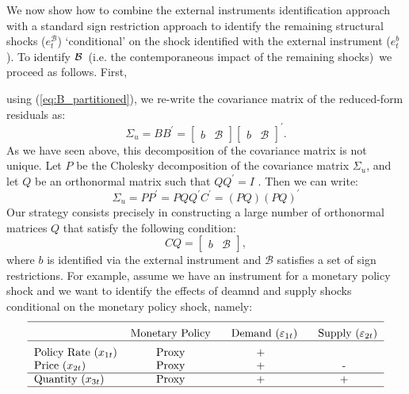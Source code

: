 \documentclass[10pt]{article}
\begin{document}
We now show how to combine the external instruments identification approach
with a standard sign restriction approach to identify the remaining
structural shocks ($e_{t}^{\mathcal{B}}$) `conditional' on the shock
identified with the external instrument ($e_{t}^{b}$). To identify $\mathcal{%
B}$\ (i.e. the contemporaneous impact of the remaining shocks)\ we proceed
as follows. First,

using (\ref{eq:B_partitioned}), we re-write the covariance matrix of the
reduced-form residuals as:%
\begin{equation}
\Sigma _{u}=BB^{\prime }=\left[ 
\begin{array}{cc}
b & \mathcal{B}%
\end{array}%
\right] \left[ 
\begin{array}{cc}
b & \mathcal{B}%
\end{array}%
\right] ^{\prime }.  \label{eq:cov_partitioned}
\end{equation}%
As we have seen above, this decomposition of the covariance matrix is not
unique. Let $P$ be the Cholesky decomposition of the covariance matrix $%
\Sigma _{u}$, and let $Q$ be an orthonormal matrix such that $QQ^{\prime }=I$%
. Then we can write:%
\begin{equation}
\Sigma _{u}=PP^{\prime }=PQQ^{\prime }C^{\prime }=\left( PQ\right) \left(
PQ\right) ^{\prime }
\end{equation}%
Our strategy consists precisely in constructing a large number of
orthonormal matrices $Q$ that satisfy the following condition:%
\begin{equation*}
CQ=\left[ 
\begin{array}{cc}
b & \mathcal{B}%
\end{array}%
\right] ,
\end{equation*}%
where $b$ is identified via the external instrument and $\mathcal{B}$
satisfies a set of sign restrictions. For example, assume we have an
instrument for a monetary policy shock and we want to identify the effects
of deamnd and supply shocks conditional on the monetary policy shock, namely:%
\begin{equation*}
\begin{tabular}{lccc}
\hline
\addlinespace & Monetary Policy & $\text{Demand}$ ($\varepsilon _{1t}$) & $%
\text{Supply}$ ($\varepsilon _{2t}$) \\ \hline
\addlinespace Policy Rate ($x_{1t}$) & Proxy & + &  \\ 
Price ($x_{2t}$) & Proxy & + & - \\ \hline
Quantity ($x_{3t}$) & Proxy & + & + \\ \hline
\end{tabular}%
\end{equation*}
\end{document}
